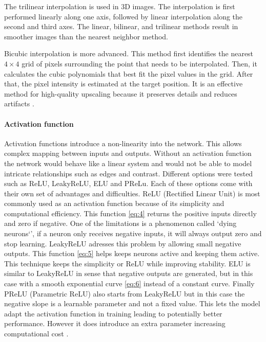 \documentclass[twocolumn]{article}
\begin{document}
The trilinear interpolation is used in 3D images. 
The interpolation is first performed linearly along one axis, followed by linear interpolation along the second and third axes. 
The linear, bilinear, and trilinear methods result in smoother images than the nearest neighbor method.

Bicubic interpolation is more advanced. This method first identifies the nearest $4 \times 4$ grid of pixels surrounding the point that needs to be interpolated. 
Then, it calculates the cubic polynomials that best fit the pixel values in the grid. 
After that, the pixel intensity is estimated at the target position. 
It is an effective method for high-quality upscaling because it preserves details and reduces artifacts \cite{amanrao-2023} \cite{unknown-author-2025}.

\paragraph{Activation function}
Activation functions introduce a non-linearity into the network. This allows complex mapping between inputs and outputs. 
Without an activation function the network would behave like a linear system and would not be able to model intricate relationships such as edges and contrast. 
Different options were tested such as ReLU,  LeakyReLU, ELU and PReLu. Each of these options come with their own set of advantages and difficulties. 
ReLU (Rectified Linear Unit) is most commonly used as an activation function because of its simplicity and computational efficiency. 
This function \ref{eq:4} returns the positive inputs directly and zero if negative. One of the limitations is a phenomenon called `dying neurons`',  if a neuron only receives negative inputs, it will always output zero and stop learning.
LeakyReLU adresses this problem by allowing small negative outputs. This function \ref{eq:5} helps keeps neurons active and keeping them active. 
This technique keeps the simplicity or ReLU while improving stability. 
ELU is similar to LeakyReLU in sense that negative outputs are generated, but in this case with a smooth exponential curve \ref{eq:6}  instead of a constant curve. 
Finally PReLU (Parametric ReLU) also starts from LeakyReLU but in this case the negative slope is a learnable parameter and not a fixed value. 
This lets the model adapt the activation function in training leading to potentially better performance. 
However it does introduce an extra parameter increasing computational cost \cite{bharatiya_2019_comprehensive}.
\end{document}
